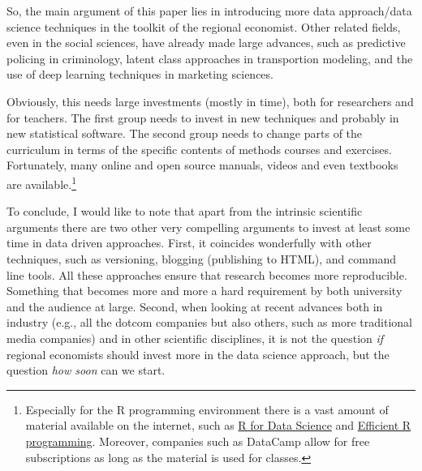 \documentclass[fleqn,10pt]{SelfArx} %
\begin{document}
So, the main argument of this paper lies in introducing more data approach/data
science techniques in the toolkit of the regional economist. Other related fields, even
in the social sciences, have already made large advances, such as predictive
policing in criminology, latent class approaches in transportion modeling, and
the use of deep learning techniques in marketing sciences. 

Obviously, this needs large investments (mostly in time), both for researchers
and for teachers. The first group needs to invest in new techniques and probably
in new statistical software. The second group needs to change parts of the
curriculum in terms of the specific contents of methods courses and exercises.
Fortunately, many online and open source manuals, videos and even textbooks are
available.\footnote{Especially for the R programming environment \citep{R2017}  there is a vast amount of
  material available on the internet, such as \href{http://r4ds.had.co.nz/}{R for Data Science}
  and \href{https://csgillespie.github.io/efficientR/}{Efficient R programming}.
Moreover, companies such as DataCamp allow for free subscriptions as long as the
material is used for classes.} 

To conclude, I would like to note that apart from the intrinsic scientific
arguments there are two other very compelling arguments to invest at least some
time in data driven approaches. First, it coincides wonderfully with other
techniques, such as versioning, blogging (publishing to HTML), and command line
tools. All these approaches ensure that research becomes more reproducible.
Something that becomes more and more a hard requirement by both university and
the audience at large. Second, when looking at recent advances both in industry
(e.g., all the dotcom companies but also others, such as more traditional media
companies) and in other scientific disciplines, it is not the question \emph{if} regional economists
should invest more in the data science approach, but the question \emph{how
  soon} can we start.  


\printbibliography

\end{document}
